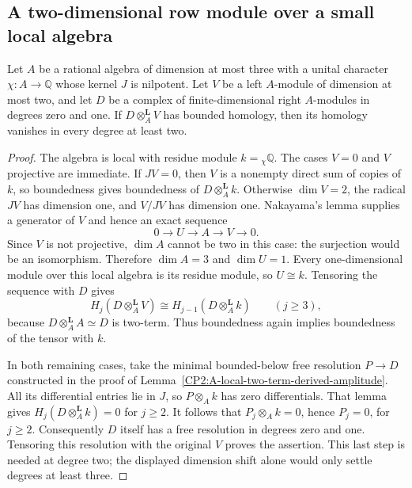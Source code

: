 \subsection{A two-dimensional row module over a small local algebra}

\begin{lemma}
\label{CP2:A-local-three-small-coefficient-complex}
Let $A$ be a rational algebra of dimension at most three with a unital
character $\chi:A\to\mathbb Q$ whose kernel $J$ is nilpotent.
Let $V$ be a left $A$-module of dimension at most two, and let $D$
be a complex of finite-dimensional right $A$-modules in degrees
zero and one.  If $D\otimes_A^{\mathbf L}V$ has bounded homology,
then its homology vanishes in every degree at least two.
\end{lemma}
\begin{proof}
The algebra is local with residue module $k={}_\chi\mathbb Q$.
The cases $V=0$ and $V$ projective are immediate.
If $JV=0$, then $V$ is a nonempty direct sum of copies of $k$,
so boundedness gives boundedness of $D\otimes_A^{\mathbf L}k$.
Otherwise $\dim V=2$, the radical $JV$ has dimension one,
and $V/JV$ has dimension one.  Nakayama's lemma supplies
a generator of $V$ and hence an exact sequence
\[
 0\longrightarrow U\longrightarrow A\longrightarrow V
 \longrightarrow0.
\]
Since $V$ is not projective, $\dim A$ cannot be two in this case:
the surjection would be an isomorphism.  Therefore $\dim A=3$
and $\dim U=1$.  Every one-dimensional module over this local
algebra is its residue module, so $U\cong k$.
Tensoring the sequence with $D$ gives
\[
 H_j(D\otimes_A^{\mathbf L}V)
   \cong H_{j-1}(D\otimes_A^{\mathbf L}k)
 \qquad(j\ge3),
\]
because $D\otimes_A^{\mathbf L}A\simeq D$ is two-term.
Thus boundedness again implies boundedness of the tensor with $k$.

In both remaining cases, take the minimal bounded-below free
resolution $P\to D$ constructed in the proof of
Lemma~\ref{CP2:A-local-two-term-derived-amplitude}.
All its differential entries lie in $J$, so $P\otimes_A k$
has zero differentials.  That lemma gives
$H_j(D\otimes_A^{\mathbf L}k)=0$ for $j\ge2$.
It follows that $P_j\otimes_A k=0$, hence $P_j=0$, for
$j\ge2$.  Consequently $D$ itself has a free resolution
in degrees zero and one.  Tensoring this resolution with
the original $V$ proves the assertion.  This last step is
needed at degree two; the displayed dimension shift alone
would only settle degrees at least three.
\end{proof}

